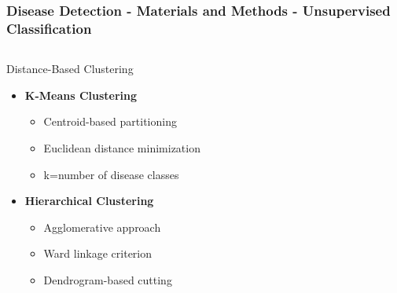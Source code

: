 \documentclass[aspectratio=43]{beamer}
\begin{document}
\begin{frame}
    \frametitle{\small Disease Detection - Materials and Methods - Unsupervised Classification}
    
    \begin{columns}
        \begin{column}{0.5\textwidth}
            \begin{block}{Distance-Based Clustering}
                \begin{itemize}
                    \item \textbf{K-Means Clustering}
                        \begin{itemize}
                            \tiny
                            \item Centroid-based partitioning
                            \item Euclidean distance minimization
                            \item k=number of disease classes
                        \end{itemize}
                    \item \textbf{Hierarchical Clustering}
                        \begin{itemize}
                            \tiny
                            \item Agglomerative approach
                            \item Ward linkage criterion
                            \item Dendrogram-based cutting
                        \end{itemize}
                \end{itemize}
            \end{block}
        \end{column}
        

\end{columns}
\end{frame}
\end{document}
